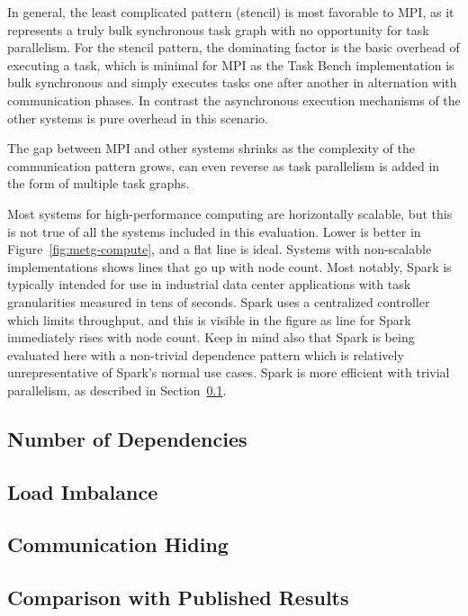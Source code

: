 In general, the least complicated pattern (stencil) is most favorable
to MPI, as it represents a truly bulk synchronous task graph with no
opportunity for task parallelism. For the stencil pattern, the
dominating factor is the basic overhead of executing a task, which is
minimal for MPI as the Task Bench implementation is bulk synchronous
and simply executes tasks one after another in alternation with
communication phases. In contrast the asynchronous execution
mechanisms of the other systems is pure overhead in this scenario.

The gap between MPI and other systems shrinks as the complexity of the
communication pattern grows, can even reverse as task parallelism is
added in the form of multiple task graphs.


Most systems for high-performance computing are horizontally scalable,
but this is not true of all the systems included in this
evaluation. Lower is better in Figure~\ref{fig:metg-compute}, and a
flat line is ideal. Systems with non-scalable implementations shows
lines that go up with node count. Most notably, Spark is typically
intended for use in industrial data center applications with task
granularities measured in tens of seconds. Spark uses a centralized
controller which limits throughput, and this is visible in the figure
as line for Spark immediately rises with node count. Keep in mind also
that Spark is being evaluated here with a non-trivial dependence
pattern which is relatively unrepresentative of Spark's normal use
cases. Spark is more efficient with trivial parallelism, as described
in Section~\ref{subsec:number-of-dependencies}.



\subsection{Number of Dependencies}
\label{subsec:number-of-dependencies}



\subsection{Load Imbalance}

\subsection{Communication Hiding}

\subsection{Comparison with Published Results}
